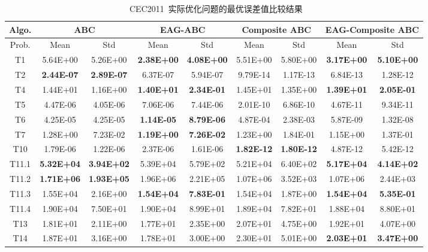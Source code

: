\begin{table*}[!ht]
  \centering
  \caption{~CEC2011~实际优化问题的最优误差值比较结果}
  \scriptsize
    \begin{tabular}{|c|cc|cc|cc|cc|}
    \hline
    Algo. & \multicolumn{2}{c|}{ABC} & \multicolumn{2}{c|}{EAG-ABC} & \multicolumn{2}{c|}{Composite ABC} & \multicolumn{2}{c|}{EAG-Composite ABC} \\
    \hline
    Prob. & Mean  & Std   & Mean  & Std   & Mean  & Std   & Mean  & Std \\
    \hline
    T1    & 5.64E+00 & 5.26E+00 & \textbf{2.38E+00} & \textbf{4.08E+00} & 5.51E+00 & 5.80E+00 & \textbf{3.17E+00} & \textbf{5.10E+00} \\
    T2    & \textbf{2.44E-07} & \textbf{2.89E-07} & 6.37E-07 & 5.94E-07 & 9.79E-14 & 1.17E-13 & 6.84E-13 & 1.28E-12 \\
    T4    & 1.44E+01 & 1.16E+00 & \textbf{1.40E+01} & \textbf{2.34E-01} & 1.45E+01 & 1.35E+00 & \textbf{1.39E+01} & \textbf{2.05E-01} \\
    T5    & 4.47E-06 & 4.05E-06 & 7.06E-06 & 7.44E-06 & 2.01E-10 & 6.86E-10 & 4.67E-11 & 9.34E-11 \\
    T6    & 4.25E-05 & 4.25E-05 & \textbf{1.14E-05} & \textbf{8.79E-06} & 4.87E-04 & 2.38E-03 & 5.87E-09 & 1.32E-08 \\
    T7    & 1.28E+00 & 7.23E-02 & \textbf{1.19E+00} & \textbf{7.26E-02} & 1.23E+00 & 1.84E-01 & 1.15E+00 & 1.37E-01 \\
    T10   & 1.79E-06 & 1.22E-06 & 2.37E-06 & 1.61E-06 & \textbf{1.82E-12} & \textbf{1.80E-12} & 4.87E-12 & 5.42E-12 \\
    T11.1 & \textbf{5.32E+04} & \textbf{3.94E+02} & 5.39E+04 & 5.79E+02 & 5.21E+04 & 6.40E+02 & \textbf{5.17E+04} & \textbf{4.14E+02} \\
    T11.2 & \textbf{1.71E+06} & \textbf{1.93E+05} & 1.96E+06 & 2.21E+05 & 1.07E+06 & 3.52E+03 & 1.07E+06 & 2.44E+03 \\
    T11.3 & 1.55E+04 & 2.16E+00 & \textbf{1.54E+04} & \textbf{7.83E-01} & 1.54E+04 & 1.87E+00 & \textbf{1.54E+04} & \textbf{5.35E-01} \\
    T11.4 & 1.90E+04 & 7.50E+01 & 1.90E+04 & 8.99E+01 & 1.89E+04 & 7.82E+01 & 1.88E+04 & 8.80E+01 \\
    T13   & 1.81E+01 & 2.11E+00 & 1.77E+01 & 2.35E+00 & 2.07E+01 & 4.75E+00 & 1.92E+01 & 4.07E+00 \\
    T14   & 1.87E+01 & 3.16E+00 & 1.78E+01 & 3.00E+00 & 2.30E+01 & 5.01E+00 & \textbf{2.03E+01} & \textbf{3.47E+00} \\

\end{tabular}
\end{table*}
